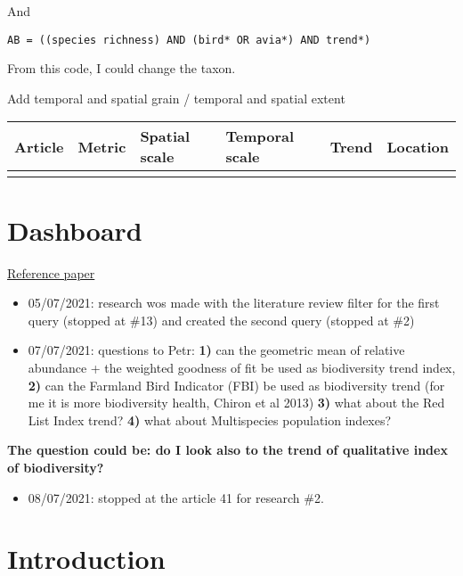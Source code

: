 \documentclass[
  12pt,
  oneside]{report}
\providecommand{\tightlist}{%
  \setlength{\itemsep}{0pt}\setlength{\parskip}{0pt}}
\begin{document}
And

\begin{verbatim}
AB = ((species richness) AND (bird* OR avia*) AND trend*) 
\end{verbatim}

From this code, I could change the taxon.

Add temporal and spatial grain / temporal and spatial extent

\begin{longtable}[]{@{}llllll@{}}
\toprule
Article & Metric & Spatial scale & Temporal scale & Trend & Location\tabularnewline
\midrule
\endhead
& & & & &\tabularnewline
\bottomrule
\end{longtable}

\hypertarget{dashboard}{%
\chapter*{Dashboard}\label{dashboard}}

\href{https://www.sciencedirect.com/science/article/pii/S1470160X20306658?via\%3Dihub}{Reference paper}

\begin{itemize}
\item
  05/07/2021: research wos made with the literature review filter for the first query (stopped at \#13) and created the second query (stopped at \#2)
\item
  07/07/2021: questions to Petr: \textbf{1)} can the geometric mean of relative abundance + the weighted goodness of fit be used as biodiversity trend index, \textbf{2)} can the Farmland Bird Indicator (FBI) be used as biodiversity trend (for me it is more biodiversity health, Chiron et al 2013) \textbf{3)} what about the Red List Index trend? \textbf{4)} what about Multispecies population indexes?
\end{itemize}

\textbf{The question could be: do I look also to the trend of qualitative index of biodiversity?}

\begin{itemize}
\tightlist
\item
  08/07/2021: stopped at the article 41 for research \#2.
\end{itemize}

\hypertarget{introduction}{%
\chapter{Introduction}\label{introduction}}
\end{document}
